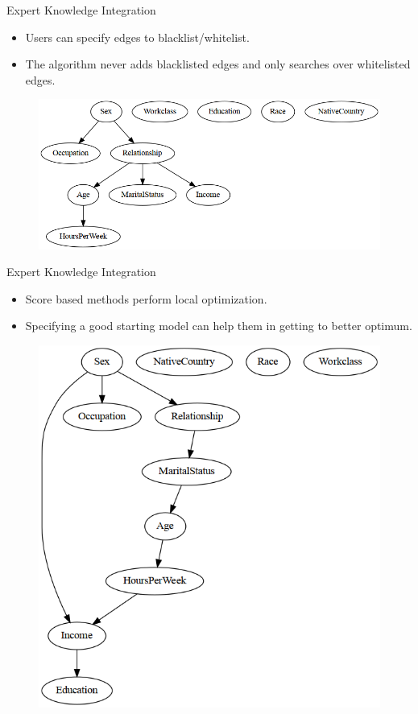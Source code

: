 \documentclass{beamer}
\begin{document}
\begin{frame}{Expert Knowledge Integration}
	\begin{itemize}
		\item Users can specify edges to blacklist/whitelist.
		\item The algorithm never adds blacklisted edges and only
			searches over whitelisted edges.
	\end{itemize}
	\begin{figure}
		\centering
		\includegraphics[scale=0.3]{imgs/adult_bic_blacklist.png}
	\end{figure}
\end{frame}

\begin{frame}{Expert Knowledge Integration}
	\begin{itemize}
		\item Score based methods perform local optimization.
		\item Specifying a good starting model can help them in getting to better 
			optimum.
	\end{itemize}
	\begin{figure}
		\centering
		\includegraphics[scale=0.3]{imgs/adult_bic_start.png}
	\end{figure}
\end{frame}
\end{document}
